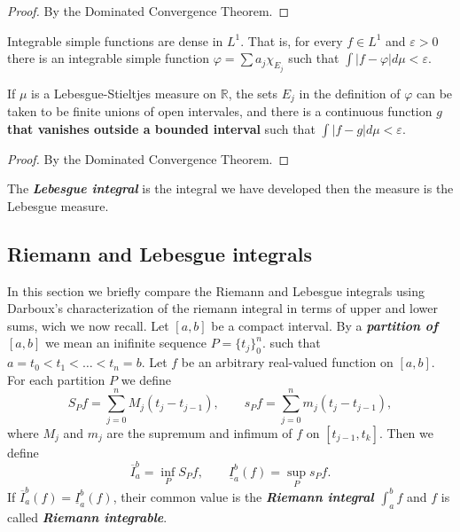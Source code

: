 \documentclass{article}
\theoremstyle{definition}
\numberwithin{equation}{section}
\newcommand{\R}{\mathbb{R}}
\begin{document}
		\begin{proof}
			By the Dominated Convergence Theorem.
		\end{proof}
		\begin{thm}
			Integrable simple functions are dense in $L^1$. That is, for every $f\in L^1$ and $\varepsilon>0$ there is an integrable simple function $\varphi=\sum a_j\chi_{E_j}$ such that $\int|f-\varphi|d\mu<\varepsilon$.
			
			If $\mu$ is a Lebesgue-Stieltjes measure on $\R$, the sets $E_j$ in the definition of $\varphi$ can be taken to be finite unions of open intervales, and there is a continuous function $g$ \textbf{that vanishes outside a bounded interval} such that $\int|f-g|d\mu<\varepsilon$.
		\end{thm}
		\begin{proof}
			By the Dominated Convergence Theorem.
		\end{proof}
		
		
		The \textbf{\textit{Lebesgue integral}} is the integral we have developed then the measure is the Lebesgue measure.
		
	\subsection{Riemann and Lebesgue integrals}
		In this section we briefly compare the Riemann and Lebesgue integrals using Darboux's characterization of the riemann integral in terms of upper and lower sums, wich we now recall. Let $[a,b]$ be a compact interval. By a \textbf{\textit{partition of $[a,b]$}} we mean an inifinite sequence $P=\{t_j\}_{0}^{n}$. such that $a=t_0<t_1<\ldots<t_n=b$. Let $f$ be an arbitrary real-valued function on $[a,b]$. For each partition $P$ we define
		\[S_Pf=\sum_{j=0}^nM_j(t_j-t_{j-1}),\qquad s_Pf=\sum_{j=0}^nm_j(t_j-t_{j-1}),\]
		where $M_j$ and $m_j$ are the supremum and infimum of $f$ on $[t_{j-1},t_k]$. Then we define
		\[\overline{I}_a^b=\inf_PS_Pf,\qquad\underline{I}^b_a(f)=\sup_Ps_Pf.\]
		If $\overline{I}^b_a(f)=\underline{I}_a^b(f)$, their common value is the \textbf{\textit{Riemann integral $\int_a^bf$}} and $f$ is called \textbf{\textit{Riemann integrable}}.
		
\end{document}
